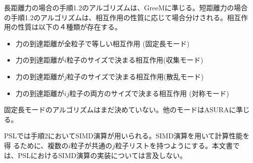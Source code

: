 長距離力の場合の手順1.2のアルゴリズムは、GreeMに準じる。短距離力の場合
の手順1.2のアルゴリズムは、相互作用の性質に応じて場合分けされる。相互作
用の性質は以下の４種類が存在する。
\begin{itemize}
\item 力の到達距離が全粒子で等しい相互作用 (固定長モード)
\item 力の到達距離が$i$粒子のサイズで決まる相互作用(収集モード)
\item 力の到達距離が$j$粒子のサイズで決まる相互作用(散乱モード)
\item 力の到達距離が$ij$粒子の両方のサイズで決まる相互作用 (対称モード)
\end{itemize}
固定長モードのアルゴリズムはまだ決めていない。他のモードはASURAに準じる。

PSLでは手順2においてSIMD演算が用いられる。SIMD演算を用いて計算性能を得
るために、複数の$i$粒子が共通の$j$粒子リストを持つようにする。本文書で
は、PSLにおけるSIMD演算の実装については言及しない。